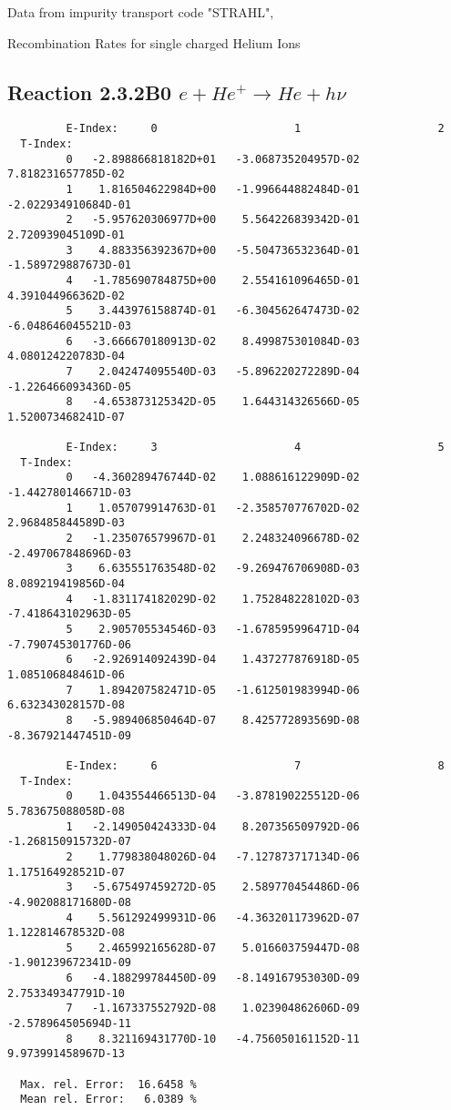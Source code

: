 \documentclass[12pt]{article}
\begin{document}
Data from impurity transport code "STRAHL", \cite{kn:Behringer}

  Recombination Rates for single charged Helium Ions

\subsection{
Reaction 2.3.2B0  $e + He^+ \rightarrow He + h\nu$
}

\begin{small}\begin{verbatim}
         E-Index:     0                     1                     2
  T-Index:
         0   -2.898866818182D+01   -3.068735204957D-02    7.818231657785D-02
         1    1.816504622984D+00   -1.996644882484D-01   -2.022934910684D-01
         2   -5.957620306977D+00    5.564226839342D-01    2.720939045109D-01
         3    4.883356392367D+00   -5.504736532364D-01   -1.589729887673D-01
         4   -1.785690784875D+00    2.554161096465D-01    4.391044966362D-02
         5    3.443976158874D-01   -6.304562647473D-02   -6.048646045521D-03
         6   -3.666670180913D-02    8.499875301084D-03    4.080124220783D-04
         7    2.042474095540D-03   -5.896220272289D-04   -1.226466093436D-05
         8   -4.653873125342D-05    1.644314326566D-05    1.520073468241D-07

         E-Index:     3                     4                     5
  T-Index:
         0   -4.360289476744D-02    1.088616122909D-02   -1.442780146671D-03
         1    1.057079914763D-01   -2.358570776702D-02    2.968485844589D-03
         2   -1.235076579967D-01    2.248324096678D-02   -2.497067848696D-03
         3    6.635551763548D-02   -9.269476706908D-03    8.089219419856D-04
         4   -1.831174182029D-02    1.752848228102D-03   -7.418643102963D-05
         5    2.905705534546D-03   -1.678595996471D-04   -7.790745301776D-06
         6   -2.926914092439D-04    1.437277876918D-05    1.085106848461D-06
         7    1.894207582471D-05   -1.612501983994D-06    6.632343028157D-08
         8   -5.989406850464D-07    8.425772893569D-08   -8.367921447451D-09

         E-Index:     6                     7                     8
  T-Index:
         0    1.043554466513D-04   -3.878190225512D-06    5.783675088058D-08
         1   -2.149050424333D-04    8.207356509792D-06   -1.268150915732D-07
         2    1.779838048026D-04   -7.127873717134D-06    1.175164928521D-07
         3   -5.675497459272D-05    2.589770454486D-06   -4.902088171680D-08
         4    5.561292499931D-06   -4.363201173962D-07    1.122814678532D-08
         5    2.465992165628D-07    5.016603759447D-08   -1.901239672341D-09
         6   -4.188299784450D-09   -8.149167953030D-09    2.753349347791D-10
         7   -1.167337552792D-08    1.023904862606D-09   -2.578964505694D-11
         8    8.321169431770D-10   -4.756050161152D-11    9.973991458967D-13

  Max. rel. Error:  16.6458 %
  Mean rel. Error:   6.0389 %

\end{verbatim}\end{small}
\end{document}
